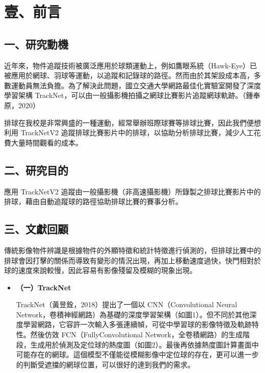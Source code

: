 \section{壹、前言}

\subsection{一、研究動機}

近年來，物件追蹤技術被廣泛應用於球類運動上，例如鷹眼系統（Hawk-Eye）已被應用於網球、羽球等運動，以追蹤和記錄球的路徑。然而由於其架設成本高，多數運動員無法負擔。為了解決此問題，國立交通大學網路最佳化實驗室開發了深度學習架構 TrackNet，可以由一般攝影機拍攝之網球比賽影片追蹤網球軌跡。（鍾奉原，2020）

排球在我校是非常興盛的一種運動，經常舉辦班際球賽等排球比賽，因此我們便想利用 TrackNetV2 追蹤排球比賽影片中的排球，以協助分析排球比賽，減少人工花費大量時間觀看的成本。

\subsection{二、研究目的}

應用 TrackNetV2 追蹤由一般攝影機（非高速攝影機）所錄製之排球比賽影片中的排球，藉由自動追蹤球的路徑協助排球比賽的賽事分析。

\subsection{三、文獻回顧}

傳統影像物件辨識是根據物件的外顯特徵和統計特徵進行偵測的，但排球比賽中的排球會因打擊的關係而導致有變形的情況出現，再加上移動速度過快，快門相對於球的速度來說較慢，因此容易有影像殘留及模糊的現象出現。

\begin{itemize}
    \setlength\parindent{2em}
    \item []
    \textbf{（一）TrackNet}

    TrackNet（黃昱銓，2018）提出了一個以 CNN（Convolutional Neural Network，卷積神經網路）為基礎的深度學習架構（如圖1）。但不同於其他深度學習網路，它容許一次輸入多張連續幀，可從中學習球的影像特徵及軌跡特性。然後仿效 FCN（FullyConvolutional Network，全卷積網路）的生成階段，生成用於偵測及定位球的熱度圖（如圖2）。最後再依據熱度圖計算畫面中可能存在的網球。這個模型不僅能從模糊影像中定位球的存在，更可以進一步的判斷受遮擋的網球位置，可以很好的達到我們的需求。

\end{itemize}

